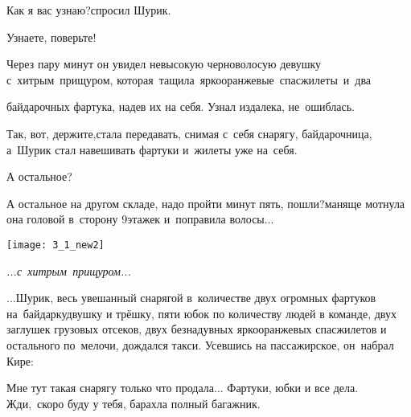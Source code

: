\diagdash Как я вас узнаю?\mdash спросил Шурик.

\diagdash Узнаете, поверьте!


\begingroup
\justifying
\parfillskip=0pt %
	
Через пару минут он увидел невысокую черноволосую девушку с~хитрым~прищуром, которая~тащила~ярко\sdash оранжевые~спасжилеты~и~два 

\par
\endgroup

\noindent
\begin{minipage}{0.55\textwidth}
	\setlength{\parindent}{1.0cm}  %
	\setlength{\parskip}{0.25cm}     %
	
	\noindent байдарочных фартука, надев их на себя. Узнал издалека, не~ошиблась.
	
	\diagdash Так, вот, держите,\mdash стала передавать, снимая с~себя снарягу, байдарочница, а~Шурик стал навешивать фартуки и~жилеты уже на~себя.
	
	\diagdash А остальное?	
	
	\diagdash А остальное на другом складе, надо пройти минут пять, пошли?\mdash маняще мотнула она головой в~сторону 9\sdash этажек и~поправила волосы$\ldots$
\end{minipage}\hfill
\begin{minipage}{0.40\textwidth}
	\centering
	\texttt{[image: 3\_1\_new2]}
	
	{\small\textit{...с~хитрым~прищуром...}}
\end{minipage}


\vspace{0.5cm}
$\ldots$Шурик, весь увешанный снарягой в~количестве двух огромных фартуков на~байдарку\sdash двушку и трёшку, пяти юбок по количеству людей в команде, двух заглушек грузовых отсеков, двух безнадувных ярко\sdash оранжевых спасжилетов и остального по~мелочи, дождался такси. Усевшись на пассажирское, он~набрал Кире:

\diagdash Мне тут такая снарягу только что продала$\ldots$ Фартуки, юбки и все дела. Жди,~скоро буду у тебя, барахла полный багажник.

